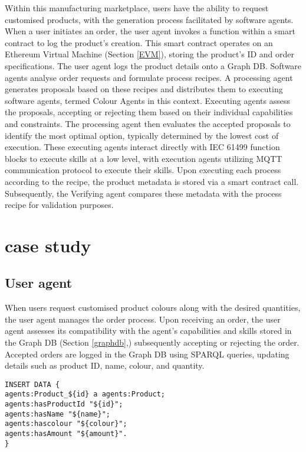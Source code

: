 \begin{bibunit}
Within this manufacturing marketplace, users have the ability to request customised products, with the generation process facilitated by software agents. When a user initiates an order, the user agent invokes a function within a smart contract to log the product's creation. This smart contract operates on an Ethereum Virtual Machine (Section \ref{EVM}), storing the product's ID and order specifications. The user agent logs the product details onto a Graph DB. Software agents analyse order requests and formulate process recipes. A processing agent generates proposals based on these recipes and distributes them to executing software agents, termed Colour Agents in this context. Executing agents assess the proposals, accepting or rejecting them based on their individual capabilities and constraints. The processing agent then evaluates the accepted proposals to identify the most optimal option, typically determined by the lowest cost of execution. These executing agents interact directly with IEC 61499 function blocks to execute skills at a low level, with execution agents utilizing MQTT communication protocol to execute their skills. Upon executing each process according to the recipe, the product metadata is stored via a smart contract call. Subsequently, the Verifying agent compares these metadata with the process recipe for validation purposes.


\section{case study}
\label{sec:casestudy}


\subsection{User agent}

When users request customised product colours along with the desired quantities, the user agent manages the order process. Upon receiving an order, the user agent assesses its compatibility with the agent's capabilities and skills stored in the Graph DB (Section \ref{graphdb},) subsequently accepting or rejecting the order. Accepted orders are logged in the Graph DB using SPARQL queries, updating details such as product ID, name, colour, and quantity. 


\begin{lstlisting}
INSERT DATA {
agents:Product_${id} a agents:Product;
agents:hasProductId "${id}";
agents:hasName "${name}";
agents:hascolour "${colour}";
agents:hasAmount "${amount}".
}
\end{lstlisting}


\end{bibunit}
